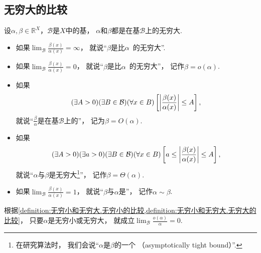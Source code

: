 \subsection{无穷大的比较}
\begin{definition}\label{definition:无穷小和无穷大.无穷大的比较}
设\(\alpha,\beta\in\mathbb{R}^X\)，\(\mathcal{B}\)是\(X\)中的基，
\(\alpha\)和\(\beta\)都是在基\(\mathcal{B}\)上的无穷大.
\newcommand{\lf}[1][]{\lim_\mathcal{B} \frac{\beta(x)}{\alpha^{#1}(x)}}
\begin{itemize}
	\item 如果\(\lf=\infty\)，
	就说“\(\beta\)是比\(\alpha\)~的无穷大”.

	\item 如果\(\lf=0\)，
	就说“\(\beta\)是比\(\alpha\)~的无穷大”，
	记作\(\beta = o(\alpha)\).

	\item 如果\begin{equation*}
		(\exists A>0)
		(\exists B\in\mathcal{B})
		(\forall x\in B)
		\left[
			\abs{\frac{\beta(x)}{\alpha(x)}} \leq A
		\right],
	\end{equation*}
	就说“\(\frac\beta\alpha\)是在基\(\mathcal{B}\)上的”，
	记为\(\beta = O(\alpha)\).

	\item 如果\begin{equation*}
		(\exists A>0)
		(\exists a>0)
		(\exists B\in\mathcal{B})
		(\forall x\in B)
		\left[
			a \leq \abs{\frac{\beta(x)}{\alpha(x)}} \leq A
		\right],
	\end{equation*}
	就说“\(\alpha\)与\(\beta\)是无穷大\footnote{在研究算法时，
	我们会说“\(\alpha\)是\(\beta\)的一个%
	（asymptotically tight bound）”.}”，
	记作\(\beta = \Theta(\alpha)\).

	\item 如果\(\lf=1\)，
	就说“\(\beta\)与\(\alpha\)是”，
	记作\(\alpha\sim\beta\).
\end{itemize}
\end{definition}
\begin{remark}
根据\cref{definition:无穷小和无穷大.无穷小的比较,definition:无穷小和无穷大.无穷大的比较}，
只要\(\alpha\)是无穷小或无穷大，
就成立\(\lim_\mathcal{B} \frac{o(\alpha)}{\alpha} = 0\).
\end{remark}

